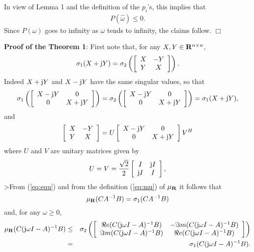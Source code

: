 \noindent
In view of Lemma 1 and the definition of the  $p_i$'s, this implies that
\begin{eqnarray}
P(\hat{\omega})
\leq 0.
\label{eq:final}
\end{eqnarray}
Since $P(\omega)$ goes to infinity as 
$\omega$ tends to infinity, the claims follow.
\hfill $\Box$


\bigskip
\noindent
{\bf Proof of the Theorem 1}: First note that, for any 
$X, Y \in {\bf R}^{n \times n}$,
\begin{equation}
\sigma_1(X+{\rm j} Y)=\sigma_2 \left( \left[
\begin{array}{cc}
X & -Y \\
Y & X
\end{array} \right] \right).
\label{eq:equ}
\end{equation}
Indeed $X+{\rm j} Y$ and $X-{\rm j} Y$ have the same singular values, so that
\[
\sigma_1 \left( \left[
\begin{array}{cc}
X-{\rm j} Y & 0 \\
0 &  X+{\rm j} Y
\end{array} \right] \right)
=
\sigma_2 \left( \left[
\begin{array}{cc}
X-{\rm j} Y & 0 \\
0 &  X+{\rm j} Y
\end{array} \right] \right)
=\sigma_1(X+{\rm j} Y),
\]
and 
\[
\left[ \begin{array}{cc}
X & -Y \\
Y & X
\end{array} \right]
=U \left[ \begin{array}{cc}
X-{\rm j} Y & 0 \\
0 &  X+{\rm j} Y
\end{array} \right]V^H
\]
where $U$ and $V$ are unitary matrices given by
\[
U=V=\frac{\sqrt2}{2}
\left[ \begin{array}{cc}
I & {\rm j} I \\
{\rm j} I & I
\end{array}
\right],
\]
>From (\ref{eq:equ}) and from the definition (\ref{eq:mu}) of $\mu_{\bf R}$ it follows
that
\[  \mu_{\bf R}(CA^{-1}B)= \sigma_1 (CA^{-1}B) \]
and, for any $\omega \geq 0$,
\begin{eqnarray}
\mu_{\bf R} (C({\rm j}\omega I-A)^{-1}B)
& \leq & \sigma_2 \left( \left[
   \begin{array}{cc}
   \Re e(C({\rm j}{\omega} I-A)^{-1}B) & -\Im m(C({\rm j}{\omega} I-A)^{-1}B) \\
   \Im m(C({\rm j}{\omega} I-A)^{-1}B) & \Re e(C({\rm j}{\omega} I-A)^{-1}B)
   \end{array} \right] \right) \\
& = & \sigma_1(C({\rm j} \omega I-A)^{-1}B).
\end{eqnarray}
